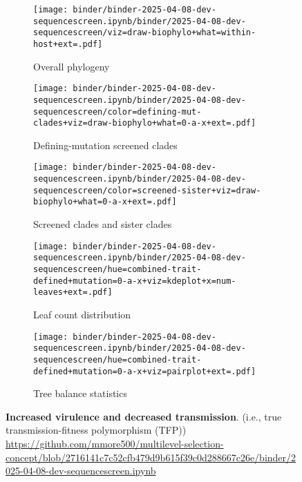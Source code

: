 \begin{figure*}[htbp]
  \centering
  \begin{subfigure}{0.32\textwidth}
    \centering
    \texttt{[image: binder/binder-2025-04-08-dev-sequencescreen.ipynb/binder/2025-04-08-dev-sequencescreen/viz=draw-biophylo+what=within-host+ext=.pdf]}
    \caption{Overall phylogeny}
    \label{fig:dev-sequencescreen:overall_phylogeny}
  \end{subfigure}
  \hfill
  \begin{subfigure}{0.32\textwidth}
    \centering
    \texttt{[image: binder/binder-2025-04-08-dev-sequencescreen.ipynb/binder/2025-04-08-dev-sequencescreen/color=defining-mut-clades+viz=draw-biophylo+what=0-a-x+ext=.pdf]}
    \caption{Defining-mutation screened clades}
    \label{fig:dev-sequencescreen:defining_mut_clades}
  \end{subfigure}
  \hfill
  \begin{subfigure}{0.32\textwidth}
    \centering
    \texttt{[image: binder/binder-2025-04-08-dev-sequencescreen.ipynb/binder/2025-04-08-dev-sequencescreen/color=screened-sister+viz=draw-biophylo+what=0-a-x+ext=.pdf]}
    \caption{Screened clades and sister clades}
    \label{fig:dev-sequencescreen:screened_sister}
  \end{subfigure}

  \vspace{0.5cm} %

  \begin{subfigure}{0.54\textwidth}
    \centering
    \texttt{[image: binder/binder-2025-04-08-dev-sequencescreen.ipynb/binder/2025-04-08-dev-sequencescreen/hue=combined-trait-defined+mutation=0-a-x+viz=kdeplot+x=num-leaves+ext=.pdf]}
    \caption{Leaf count distribution}
    \label{fig:dev-sequencescreenleaf_count}
  \end{subfigure}
  \hfill
  \begin{subfigure}{0.44\textwidth}
    \centering
    \texttt{[image: binder/binder-2025-04-08-dev-sequencescreen.ipynb/binder/2025-04-08-dev-sequencescreen/hue=combined-trait-defined+mutation=0-a-x+viz=pairplot+ext=.pdf]}
    \caption{Tree balance statistics}
    \label{fig:dev-sequencescreen:tree_balance}
  \end{subfigure}

  \caption{\textbf{Increased virulence and decreased transmission}. (i.e., true transmission-fitness polymorphism (TFP)) \url{https://github.com/mmore500/multilevel-selection-concept/blob/2716141c7c52cfb479d9b615f39c0d288667c26e/binder/2025-04-08-dev-sequencescreen.ipynb}}
  \label{fig:dev-sequencescreen}
\end{figure*}
